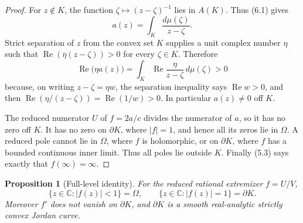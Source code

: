 \documentclass[11pt]{article}
\newtheorem{proposition}[theorem]{Proposition}
\theoremstyle{definition}
\theoremstyle{remark}
\newcommand{\C}{\mathbb C}
\newcommand{\Rea}{\operatorname{Re}}
\begin{document}
\begin{proof}
For \(z\notin K\), the function \(\zeta\mapsto(z-\zeta)^{-1}\) lies in
\(A(K)\).  Thus (6.1) gives
\[
 a(z)=\int_K\frac{d\mu(\zeta)}{z-\zeta}.              \tag{6.2}
\]
Strict separation of \(z\) from the convex set \(K\) supplies a unit complex
number \(\eta\) such that
\(\Rea(\overline\eta(z-\zeta))>0\) for every \(\zeta\in K\).
Therefore
\[
 \Rea\bigl(\eta a(z)\bigr)
 =\int_K\Rea\frac{\eta}{z-\zeta}\,d\mu(\zeta)>0
\]
because, on writing \(z-\zeta=\eta w\), the separation inequality says
\(\Rea w>0\), and then
\(\Rea(\eta/(z-\zeta))=\Rea(1/w)>0\).  In particular \(a(z)\neq0\) off \(K\).

The reduced numerator \(U\) of \(f=2a/c\) divides the numerator of \(a\), so it has
no zero off \(K\).  It has no zero on \(\partial K\), where \(|f|=1\), and
hence all its zeros lie in \(\Omega\).  A reduced pole cannot lie in
\(\Omega\), where \(f\) is holomorphic, or on \(\partial K\), where \(f\) has
a bounded continuous inner limit.  Thus all poles lie outside \(K\).
Finally (5.3) says exactly that \(f(\infty)=\infty\).
\end{proof}

\begin{proposition}[Full-level identity]\label{prop:full-level}
For the reduced rational extremizer \(f=U/V\),
\[
 \{z\in\C:|f(z)|<1\}=\Omega,\qquad
 \{z\in\C:|f(z)|=1\}=\partial K.                      \tag{6.3}
\]
Moreover \(f'\) does not vanish on \(\partial K\), and \(\partial K\) is a
smooth real-analytic strictly convex Jordan curve.
\end{proposition}
\end{document}
